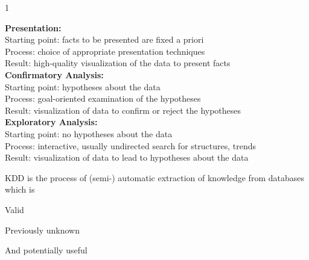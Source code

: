 \documentclass{article}
\begin{document}
    \begin{ukon-infie}[01.11.17]{1}

        \begin{exercise}[p=3]{}
\textbf{Presentation:} \\
Starting point: facts to be presented are fixed a priori \\
Process: choice of appropriate presentation techniques \\
Result: high-quality visualization of the data to present facts \\
\textbf{Confirmatory Analysis:} \\
Starting point: hypotheses about the data\\
Process: goal-oriented examination of the hypotheses\\
Result: visualization of data to confirm or reject the hypotheses\\
\textbf{Exploratory Analysis:}\\
Starting point: no hypotheses about the data\\
Process: interactive, usually undirected search for structures, trends\\
Result: visualization of data to lead to hypotheses about the data
        \end{exercise}
        
        \begin{exercise}[p=2]{}
		KDD is the process of (semi-) automatic extraction of knowledge from databases which is \begin{list}{-}{}
		\item{Valid}
		\item{Previously unknown}
		\item{And potentially useful}
		\end{list}
		\end{exercise}
		

\end{ukon-infie}
\end{document}
